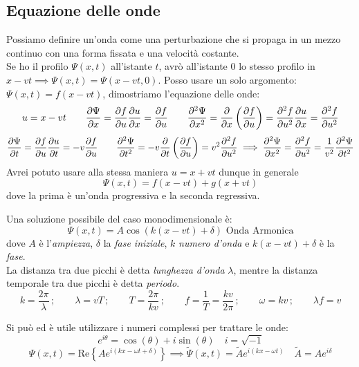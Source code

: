 \documentclass[12pt,a4paper]{article}
\begin{document}
\subsection{Equazione delle onde}
Possiamo definire un'onda come una perturbazione che si propaga in un mezzo continuo con una forma fissata e una velocità costante.
\\ Se ho il profilo $\Psi(x,t)$ all'istante $t$, avrò all'istante $0$ lo stesso profilo in $x-vt \implies \Psi(x,t)= \Psi(x-vt,0)$.
Posso usare un solo argomento: $\Psi(x,t)= f(x-vt)$, dimostriamo l'equazione delle onde:
\begin{equation*}
    u= x-vt\qquad\pdv{\Psi}{x}= \pdv{f}{u}\pdv{u}{x}= \pdv{f}{u}\qquad\pdv[2]{\Psi}{x}= \pdv{}{x}\left( \pdv{f}{u} \right)=\pdv[2]{f}{u}\pdv{u}{x}=\pdv[2]{f}{u}
\end{equation*}
\begin{equation*}
    \pdv{\Psi}{t}= \pdv{f}{u}\pdv{u}{t}= -v\pdv{f}{u}\qquad\pdv[2]{\Psi}{t}= -v\pdv{}{t}\left( \pdv{f}{u} \right)= v^2\pdv[2]{f}{u}\implies \pdv[2]{\Psi}{x}= \pdv[2]{f}{u}= \frac{1}{v^2}\pdv[2]{\Psi}{t}
\end{equation*}
Avrei potuto usare alla stessa maniera $u = x+vt$ dunque in generale\[\Psi(x,t)= f(x-vt)+g(x+vt)\]
dove la prima è un'onda progressiva e la seconda regressiva.


Una soluzione possibile del caso monodimensionale è:
\begin{equation*}
    \Psi(x,t)= A\cos(k(x-vt)+\delta) \text{  Onda Armonica}
\end{equation*}
dove $A$ è l'\textit{ampiezza}, $\delta$ la \textit{fase iniziale}, $k$ \textit{numero d'onda} e $k(x-vt)+\delta$ è la \textit{fase}.
\\La distanza tra due picchi è detta \textit{lunghezza d'onda} $\lambda$, mentre
la distanza temporale tra due picchi è detta \textit{periodo}.
\begin{equation*}
    k= \frac{2\pi}{\lambda}\,;\qquad \lambda= vT\,;\qquad T=\frac{2\pi}{kv}\,;\qquad f = \frac{1}{T}= \frac{kv}{2\pi}\,;
    \qquad \omega= kv\,;\qquad\lambda f= v 
\end{equation*}

Si può ed è utile utilizzare i numeri complessi per trattare le onde:
\begin{equation*}
    e^{ i\theta }= \cos(\theta)+ i\sin(\theta) \quad i = \sqrt{-1}
\end{equation*}
\begin{equation*}
    \Psi(x,t) = \mathrm{Re}\left\{ A e^{ i\left( kx-\omega t +\delta \right) } \right\}\implies \tilde{\Psi}(x,t) = \tilde{A} e^{ i\left( kx-\omega t \right) }\quad \tilde{A}= Ae^{i\delta}
\end{equation*}
\end{document}
